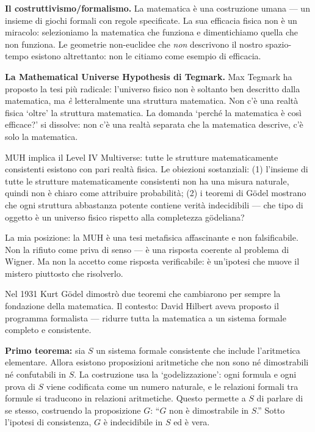 \documentclass[12pt,a4paper,openany]{book}
\newcommand{\sezione}[1]{\vspace{1.2em}{\large\bfseries #1}\vspace{0.5em}\par}
\begin{document}
\textbf{Il costruttivismo/formalismo.} La matematica è una costruzione umana — un insieme di giochi formali con regole specificate. La sua efficacia fisica non è un miracolo: selezioniamo la matematica che funziona e dimentichiamo quella che non funziona. Le geometrie non-euclidee che \textit{non} descrivono il nostro spazio-tempo esistono altrettanto: non le citiamo come esempio di efficacia.

\textbf{La Mathematical Universe Hypothesis di Tegmark.} Max Tegmark ha proposto la tesi più radicale: l'universo fisico non è soltanto ben descritto dalla matematica, ma \textit{è} letteralmente una struttura matematica. Non c'è una realtà fisica `oltre' la struttura matematica. La domanda `perché la matematica è così efficace?' si dissolve: non c'è una realtà separata che la matematica descrive, c'è solo la matematica.

MUH implica il Level IV Multiverse: tutte le strutture matematicamente consistenti esistono con pari realtà fisica. Le obiezioni sostanziali: (1) l'insieme di tutte le strutture matematicamente consistenti non ha una misura naturale, quindi non è chiaro come attribuire probabilità; (2) i teoremi di Gödel mostrano che ogni struttura abbastanza potente contiene verità indecidibili — che tipo di oggetto è un universo fisico rispetto alla completezza gödeliana?

La mia posizione: la MUH è una tesi metafisica affascinante e non falsificabile. Non la rifiuto come priva di senso — è una risposta coerente al problema di Wigner. Ma non la accetto come risposta verificabile: è un'ipotesi che muove il mistero piuttosto che risolverlo.

\sezione{I teoremi di incompletezza di Gödel}

Nel 1931 Kurt Gödel dimostrò due teoremi che cambiarono per sempre la fondazione della matematica. Il contesto: David Hilbert aveva proposto il programma formalista — ridurre tutta la matematica a un sistema formale completo e consistente.

\textbf{Primo teorema:} sia $S$ un sistema formale consistente che include l'aritmetica elementare. Allora esistono proposizioni aritmetiche che non sono né dimostrabili né confutabili in $S$. La costruzione usa la `godelizzazione': ogni formula e ogni prova di $S$ viene codificata come un numero naturale, e le relazioni formali tra formule si traducono in relazioni aritmetiche. Questo permette a $S$ di parlare di se stesso, costruendo la proposizione $G$: ``$G$ non è dimostrabile in $S$.'' Sotto l'ipotesi di consistenza, $G$ è indecidibile in $S$ ed è vera.
\end{document}
